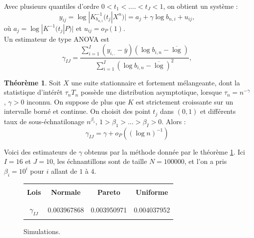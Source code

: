 \documentclass{article}
\theoremstyle{definition}
\newtheorem{thm}{Théorème}
\begin{document}
Avec plusieurs quantiles d'ordre $0<t_1<....< t_J<1$, on obtient un système :
\[y_{ij}= \log|K^{-1}_{b_{n,i}}(t_j|X^n)|=a_j+\gamma \log b_{n,i}+u_{ij}, \]
où $a_j=\log|K^{-1}(t_j|P)| $ et $u_{ij}=o_P(1)$.\\

 Un estimateur de type ANOVA est 
\[\gamma_{IJ}=\frac{\sum_{i=1}^I(y_{i,.}-\overline y)(\log b_{i,n}-\overline\log)}{\sum_{i=1}^I(\log b_{i,n}-\overline\log)^2},\]

\begin{thm}\label{Anova}
Soit $X$ une suite stationnaire et fortement mélangeante, dont la statistique d'intérêt $\tau_n T_n$ possède une distribution asymptotique, lorsque $\tau_n = n^{-\gamma}$, $\gamma>0$ inconnu. On suppose de plus que $K$ est strictement croissante sur un intervalle borné et continue. On choisit des point $t_j$ dans $(0,1)$ et différents taux de sous-échnatilonage $n^{\beta_i}$, $1>\beta_1>...>\beta_I>0$. Alors :
\[\gamma _{IJ}=\gamma +o_P((\log n )^{-1})\]
\end{thm}

Voici des estimateurs de $\gamma$ obtenus par la méthode donnée par le théorème \ref{Anova}. Ici $I=16$ et $J=10$, les échnantillons sont de taille $N=100 000$, et l'on a pris $\beta_i=10^i$ pour $i$ allant de $1$ à $4$. 
\begin{figure}[!h]\centering
\begin{tabular}{|c|c|c|c|}
\hline
& & & \\
\textbf{Lois} & \textbf{Normale} & \textbf{Pareto} & \textbf{Uniforme } \\
& & & \\
\hline
& & & \\
$\gamma_{IJ}$  & 0.003967868 & 0.003950971 & 0.004037952 \\
& & & \\
\hline
\end{tabular}
\caption{Simulations.}
\end{figure}

\newpage

 
\nocite{*}
\end{document}
